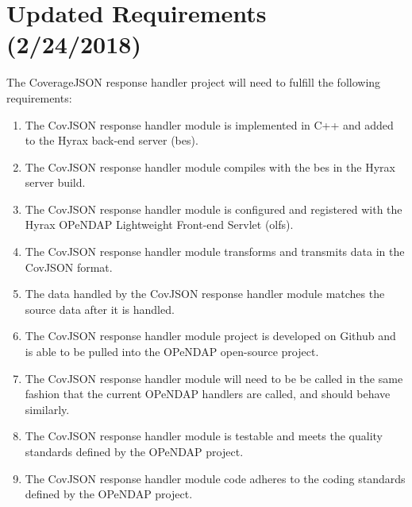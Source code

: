 \documentclass[onecolumn, draftclsnofoot,10pt, compsoc]{IEEEtran}
\begin{document}
\section{Updated Requirements (2/24/2018)}
The CoverageJSON response handler project will need to fulfill the following requirements:
\begin{enumerate}
\item The CovJSON response handler module is implemented in C++ and added to the Hyrax back-end server (bes).
\item The CovJSON response handler module compiles with the bes in the Hyrax server build.
\item The CovJSON response handler module is configured and registered with the Hyrax OPeNDAP Lightweight Front-end Servlet (olfs).
\item The CovJSON response handler module transforms and transmits data in the CovJSON format.
\item The data handled by the CovJSON response handler module matches the source data after it is handled.
\item The CovJSON response handler module project is developed on Github and is able to be pulled into the OPeNDAP open-source project.
\item The CovJSON response handler module will need to be be called in the same fashion that the current OPeNDAP handlers are called, and should behave similarly.
\item The CovJSON response handler module is testable and meets the quality standards defined by the OPeNDAP project.
\item The CovJSON response handler module code adheres to the coding standards defined by the OPeNDAP project.
\end{enumerate}
\end{document}
